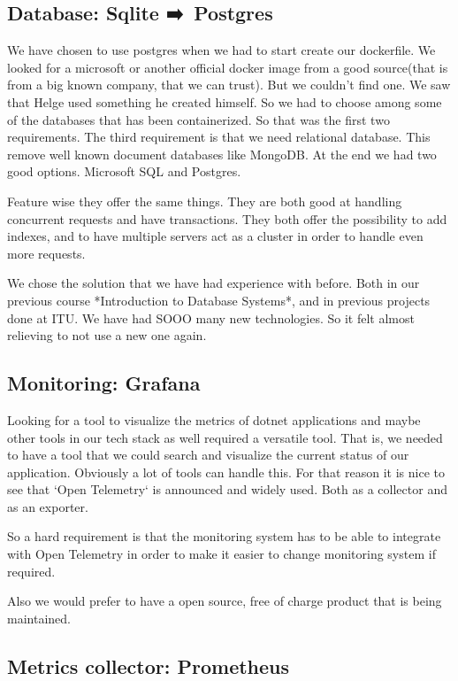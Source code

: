 \subsection{Database: Sqlite ➡️ Postgres}

We have chosen to use postgres when we had to start create our dockerfile. We looked for a microsoft or another official docker image from a good source(that is from a big known company, that we can trust). But we couldn’t find one. We saw that Helge used something he created himself. So we had to choose among some of the databases that has been containerized. So that was the first two requirements. The third requirement is that we need relational database. This remove well known document databases like MongoDB. At the end we had two good options. Microsoft SQL and Postgres.

Feature wise they offer the same things. They are both good at handling concurrent requests and have transactions. They both offer the possibility to add indexes, and to have multiple servers act as a cluster in order to handle even more requests.

We chose the solution that we have had experience with before. Both in our previous course *Introduction to Database Systems*, and in previous projects done at ITU. We have had SOOO many new technologies. So it felt almost relieving to not use a new one again.

\subsection{Monitoring: Grafana}

Looking for a tool to visualize the metrics of dotnet applications and maybe other tools in our tech stack as well required a versatile tool. That is, we needed to have a tool that we could search and visualize the current status of our application. Obviously a lot of tools can handle this. For that reason it is nice to see that `Open Telemetry` is announced and widely used. Both as a collector and as an exporter.

So a hard requirement is that the monitoring system has to be able to integrate with Open Telemetry in order to make it easier to change monitoring system if required.

Also we would prefer to have a open source, free of charge product that is being maintained.

\subsection{Metrics collector: Prometheus}

